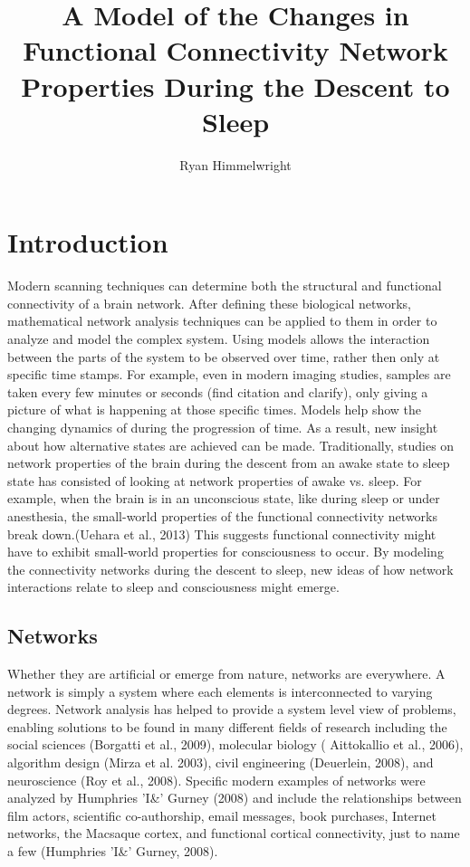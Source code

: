 \documentclass[11pt,letterpaper,doublespacing,titlepage]{article}
\author{Ryan Himmelwright}
\title{A Model of  the Changes in Functional Connectivity Network Properties During the Descent to Sleep}
\begin{document}
\maketitle
\section{Introduction}
\par
 Modern scanning techniques can determine both the structural and functional connectivity of a brain network. After defining these biological networks, mathematical network analysis techniques can be applied to them in order to analyze and model the complex system. Using models allows the interaction between the parts of the system to be observed over time, rather then only at specific time stamps. For example, even in modern imaging studies, samples are taken every few minutes or seconds (find citation and clarify), only giving a picture of what is happening at those specific times. Models help show the changing dynamics of during the progression of time. As a result, new insight about how alternative states are achieved can be made. Traditionally, studies on network properties of the brain during the descent from an awake state to sleep state has consisted of looking at network properties of awake vs. sleep. For example, when the brain is in an unconscious state, like during sleep or under anesthesia, the small-world properties of the functional connectivity networks break down.(Uehara et al., 2013) This suggests functional connectivity might have to exhibit small-world properties for consciousness to occur. By modeling the connectivity networks during the descent to sleep, new ideas of how network interactions relate to sleep and consciousness might emerge.
\subsection{Networks}
\par
Whether they are artificial or emerge from nature, networks are everywhere. A network is simply a system where each elements is interconnected to varying degrees. Network analysis has helped to provide a system level view of problems, enabling solutions to be found in many different fields of research including the social sciences (Borgatti et al., 2009), molecular biology ( Aittokallio et al., 2006), algorithm design (Mirza et al. 2003), civil engineering (Deuerlein, 2008), and neuroscience (Roy et al., 2008). Specific modern examples of networks were analyzed by Humphries 'I\&' Gurney (2008) and include the relationships between film actors, scientific co-authorship, email messages, book purchases, Internet networks, the Macsaque cortex, and functional cortical connectivity, just to name a few (Humphries 'I\&' Gurney, 2008).
\end{document}
